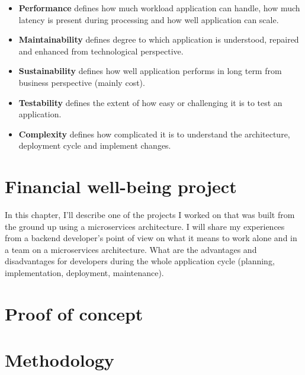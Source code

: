 \begin{itemize}
    \item \textbf{Performance} defines how much workload application can handle, how much latency is present during processing and how well application can scale.
    \item \textbf{Maintainability} defines degree to which application is understood, repaired and enhanced from technological perspective.  \cite{SOFTWARE_MAINTAINABILITY}
    \item \textbf{Sustainability} defines how well application performs in long term from business perspective (mainly cost).
    \item \textbf{Testability} defines the extent of how easy or challenging it is to test an application.
    \item \textbf{Complexity} defines how complicated it is to understand the architecture, deployment cycle and implement changes.
\end{itemize}








\chapter{Financial well-being project}
\label{chapter:personal_experience}
In this chapter, I'll describe one of the projects I worked on that was built from the ground up using a microservices architecture. I will share my experiences from a backend developer's point of view on what it means to work alone and in a team on a microservices architecture. What are the advantages and disadvantages for developers during the whole application cycle (planning, implementation, deployment, maintenance).



\chapter{Proof of concept}
\label{chapter:example_application}



\chapter{Methodology}

